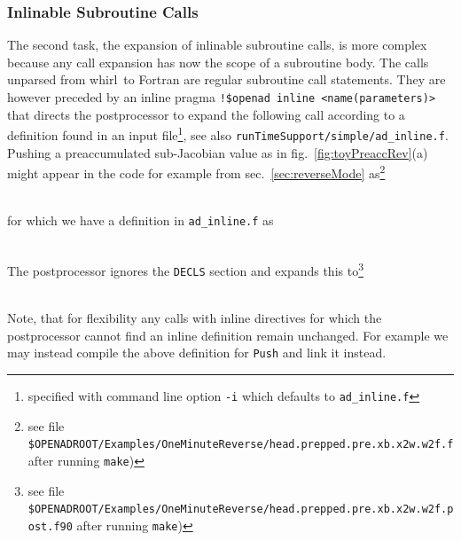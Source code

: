 \documentclass{book}
\newcommand{\whirl}{whirl}
\newcommand{\refsec}[1]{{sec.~\ref{#1}}}
\newcommand{\reffig}[1]{{fig.~\ref{#1}}}
\begin{document}
\subsubsection{Inlinable Subroutine Calls}\label{sec:inline}
The second task, the expansion of inlinable subroutine calls, is more complex because 
any call expansion has now the scope of a subroutine body. The calls unparsed from \whirl\ to 
Fortran are regular subroutine call statements. They are however preceded by an inline  pragma
\lstinline{!$openad inline <name(parameters)>}  
that directs the postprocessor to expand the following call according to a definition 
found in an input file\footnote{
specified with command line option \lstinline{-i} which defaults to \lstinline{ad_inline.f}
}, see also \lstinline{runTimeSupport/simple/ad_inline.f}.
Pushing a preaccumulated sub-Jacobian value as in  \reffig{fig:toyPreaccRev}(a) might appear 
in the code for example from \refsec{sec:reverseMode} as\footnote{
see file \lstinline{$OPENADROOT/Examples/OneMinuteReverse/head.prepped.pre.xb.x2w.w2f.f} after running \lstinline{make}) %
} \\[1ex]
\hspace*{.05\textwidth}\begin{minipage}{.6\textwidth}
\small

\end{minipage}\\
for which we have a definition in \lstinline{ad_inline.f} as \\[1ex]
\hspace*{.05\textwidth}\begin{minipage}{.6\textwidth}
\small

\end{minipage}\\
The postprocessor ignores the \lstinline{DECLS} section and  expands this to\footnote{
see file \lstinline{$OPENADROOT/Examples/OneMinuteReverse/head.prepped.pre.xb.x2w.w2f.post.f90} after running \lstinline{make}) %
}\\[1ex]
\hspace*{.05\textwidth}\begin{minipage}{.6\textwidth}
\small

\end{minipage}\\
Note, that for flexibility 
any calls with inline directives for which the postprocessor cannot find an inline definition remain 
unchanged. For example we may instead compile the above definition for \lstinline{Push} and link 
it instead.
\end{document}
